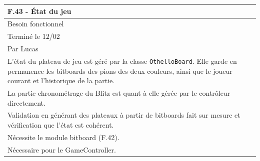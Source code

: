 \documentclass[a4paper,12pt]{article}
\begin{document}
\noindent
\setlength{\arrayrulewidth}{1.5pt}
\renewcommand{\arraystretch}{1.5}
\begin{tabularx}{\textwidth}{|X|}
    \hline
    \textbf{F.43 - État du jeu}                                                                                                                                                                          \\
    \hline
    Besoin fonctionnel                                                                                                                                                                                   \\
    \hline
    Terminé le 12/02                                                                                                                                                                                     \\
    Par Lucas                                                                                                                                                                                            \\
    \hline
    L’état du plateau de jeu est géré par la classe \texttt{OthelloBoard}. Elle garde en permanence les bitboards des pions des deux couleurs, ainsi que le joueur courant et l’historique de la partie. \\
    La partie chronométrage du Blitz est quant à elle gérée par le contrôleur directement.                                                                                                               \\
    \arrayrulecolor{MediumAquamarine}\hline
    \arrayrulecolor{CornflowerBlue}
    Validation en générant des plateaux à partir de bitboards fait sur mesure et vérification que l’état est cohérent.                                                                                   \\
    \arrayrulecolor{MediumAquamarine}\hline
    \arrayrulecolor{CornflowerBlue}
    Nécessite le module bitboard (F.42).                                                                                                                                                                 \\
    Nécessaire pour le GameController.                                                                                                                                                                   \\
    \hline
\end{tabularx}
\end{document}
